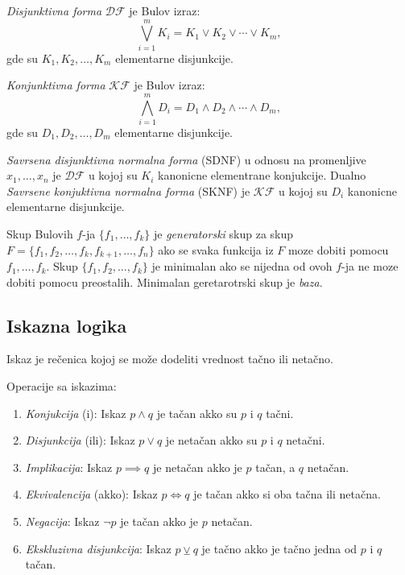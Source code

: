 \documentclass[12p,14paper]{article}
\begin{document}
\begin{multicols}{2}
    \textit{Disjunktivna forma} $\mathcal{DF}$ je Bulov izraz:
    \[
        \bigvee_{i = 1}^{m} K_i = K_1 \lor K_2 \lor \cdots \lor K_m,
    \]
    gde su $K_1, K_2, \ldots, K_m$ elementarne disjunkcije.

    \textit{Konjunktivna forma} $\mathcal{KF}$ je Bulov izraz:
    \[
        \bigwedge_{i = 1}^{m} D_i = D_1 \land D_2 \land \cdots \land D_m,
    \]
    gde su $D_1, D_2, \ldots, D_m$ elementarne disjunkcije.

    \textit{Savrsena disjunktivna normalna forma} (SDNF) u odnosu na 
    promenljive $x_1, \ldots, x_n$ je $\mathcal{DF}$ u kojoj su $K_i$ 
    kanonicne elementrane konjukcije. 
    Dualno \textit{Savrsene konjuktivna normalna forma} (SKNF) je 
    $\mathcal{KF}$ u kojoj su $D_i$ kanonicne elementarne disjunkcije.

    Skup Bulovih $f$-ja $\{f_1, \ldots, f_k\}$ je \textit{generatorski} skup 
    za skup $F = \{f_1, f_2, \ldots, f_k, f_{k+1}, \ldots, f_n\}$ ako se 
    svaka funkcija iz $F$ moze dobiti pomocu $f_1, \ldots, f_k$. Skup
    $\{f_1, f_2, \ldots, f_k\}$ je minimalan ako se nijedna od ovoh $f$-ja ne
    moze dobiti pomocu preostalih. Minimalan geretarotrski skup je 
    \textit{baza}.

\subsection{Iskazna logika}

    Iskaz je rečenica kojoj se može dodeliti vrednost tačno ili netačno.

    Operacije sa iskazima:
    \begin{enumerate}
        \itemsep0em
        \item \textit{Konjukcija} (i): Iskaz $p \land q$ je tačan akko su 
            $p$ i $q$ tačni.
        \item \textit{Disjunkcija} (ili): Iskaz $p \lor q$ je netačan akko
            su $p$ i $q$ netačni.
        \item \textit{Implikacija}: Iskaz $p \implies q$ je netačan akko
            je $p$ tačan, a $q$ netačan.
        \item \textit{Ekvivalencija} (akko): Iskaz $p \iff q$ je tačan akko 
            si oba tačna ili netačna.
        \item \textit{Negacija}: Iskaz $\neg p$ je tačan akko je $p$ netačan.
        \item \textit{Ekskluzivna disjunkcija}: Iskaz $p \veebar q$ je tačno
            akko je tačno jedna od $p$ i $q$ tačan.
    \end{enumerate}


\end{multicols}
\end{document}
